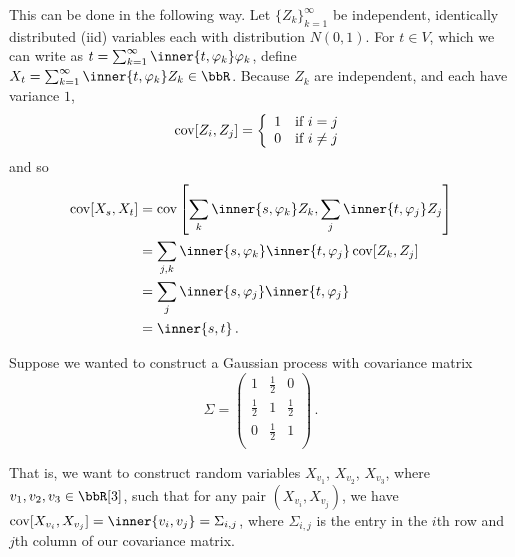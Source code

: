 \documentclass[../../../Master/AppliedStochastics.tex]{subfiles}
\begin{document}
\begin{enumerate}[(1)]
    This can be done in the following way.
    Let $\{Z_k\}_{k=1}^\infty$ be independent, identically distributed (iid)
        variables each with distribution $N(0, 1)$.
    For $t \in V$, which we can write as
        $t = \sum_{k = 1}^\infty \inner{t, \varphi_k} \varphi_k$,
        define $X_t = \sum_{k=1}^\infty \inner{t, \varphi_k} Z_k \in \bbR$.
    Because $Z_k$ are independent, and each have variance $1$,
    \begin{equation*}
        \operatorname{cov}[Z_i, Z_j] = \left\{\begin{array}{cc}
                            1 & \text{if } i = j \\
                            0 & \text{if } i \neq j \\
                         \end{array}\right.
    \end{equation*}
        and so
    \begin{align*}
        \cov[X_s, X_t] &= \cov\left[\sum_k \inner{s, \varphi_k} Z_k,
                            \sum_j \inner{t, \varphi_j} Z_j\right] \\
                       &= \sum_{j, k} \inner{s, \varphi_k} \inner{t, \varphi_j}
                            \cov[Z_k, Z_j] \\
                       &= \sum_j \inner{s, \varphi_j} \inner{t, \varphi_j} \\
                       &= \inner{s, t}\,.
    \end{align*}


    \begin{example}
    Suppose we wanted to construct a Gaussian process with covariance matrix
    \begin{equation*}
        \Sigma = \left(\begin{array}{ccc}
                1 & \frac{1}{2} & 0\\
                \frac{1}{2} & 1 & \frac{1}{2}\\
                0 & \frac{1}{2} & 1\\
                 \end{array}\right)\,.
    \end{equation*}
    
    
    That is, we want to construct random variables
        $X_{v_1}$, $X_{v_2}$, $X_{v_3}$, where $v_1, v_2, v_3 \in \bbR[3]$,
            such that for any pair $(X_{v_i}, X_{v_j})$, we have 
            $\cov[X_{v_i}, X_{v_j}] = \inner{v_i, v_j} = \Sigma_{i, j}$,
        where $\Sigma_{i, j}$ is the entry in the $i$th row and $j$th column
            of our covariance matrix.
    

\end{example}
\end{enumerate}
\end{document}
